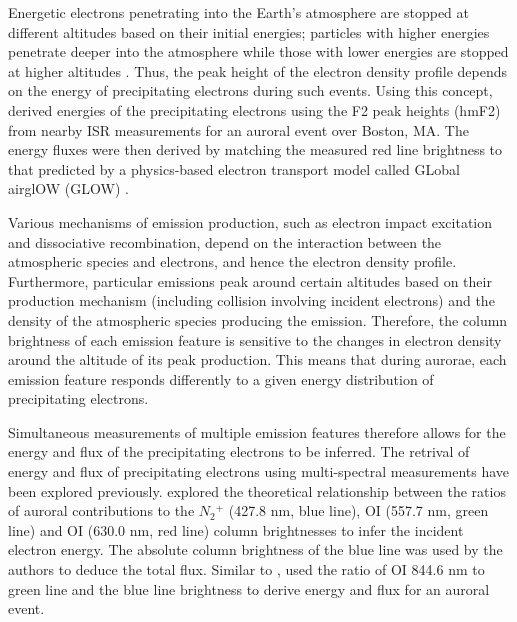 \documentclass[crop=false,class=mitthesis,oneside,font=12pt]{standalone}
\begin{document}
Energetic electrons penetrating into the Earth's atmosphere are stopped at different altitudes based on their initial energies; particles with higher energies penetrate deeper into the atmosphere while those with lower energies are stopped at higher altitudes \citep{rees_1963}. Thus, the peak height of the electron density profile depends on the energy of precipitating electrons during such events.
Using this concept, \cite{pallamraju_2011} derived energies of the precipitating electrons using the F2 peak heights (hmF2) from nearby ISR measurements for an auroral event over Boston, MA. The energy fluxes were then derived by matching the measured red line brightness to that predicted by a physics-based electron transport model called GLobal airglOW (GLOW) \citep{solomon_1988,solomon1989630,bailey2002}.  

%
%


Various mechanisms of emission production, such as electron impact excitation and dissociative recombination, depend on the interaction between the atmospheric species and electrons, and hence the electron density profile. Furthermore, particular emissions peak around certain altitudes based on their production mechanism (including collision involving incident electrons) and the density of the atmospheric species producing the emission. Therefore, the column brightness of each emission feature is sensitive to the changes in electron density around the altitude of its peak production. This means that during aurorae, each emission feature responds differently to a given energy distribution of precipitating electrons. 

Simultaneous measurements of multiple emission features therefore allows for the energy and flux of the precipitating electrons to be inferred. The retrival of energy and flux of precipitating electrons using multi-spectral measurements have been explored previously. \citet{rees_1974} explored the theoretical relationship between the ratios of auroral contributions to the $N{_2}{^+}$ (427.8 nm, blue line), OI (557.7 nm, green line) and OI (630.0 nm, red line) column brightnesses to infer the incident electron energy. The absolute column brightness of the blue line was used by the authors to deduce the total flux. Similar to \citet{rees_1974}, \citet{grubbs_compare} used the ratio of OI 844.6 nm to green line and the blue line brightness to derive energy and flux for an auroral event.
\end{document}
